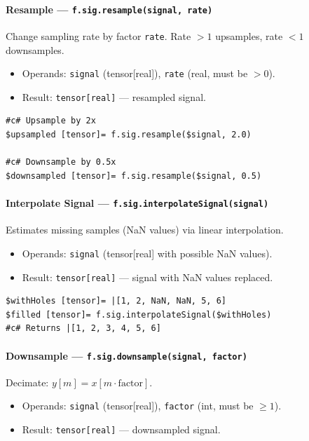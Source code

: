 \paragraph{Resample --- \texttt{f.sig.resample(signal, rate)}}
Change sampling rate by factor \texttt{rate}. Rate $> 1$ upsamples, rate $< 1$ downsamples.

\begin{itemize}
\item Operands: \texttt{signal} (tensor[real]), \texttt{rate} (real, must be $> 0$).
\item Result: \texttt{tensor[real]} --- resampled signal.
\end{itemize}

\begin{verbatim}
#c# Upsample by 2x
$upsampled [tensor]= f.sig.resample($signal, 2.0)

#c# Downsample by 0.5x
$downsampled [tensor]= f.sig.resample($signal, 0.5)
\end{verbatim}

\paragraph{Interpolate Signal --- \texttt{f.sig.interpolateSignal(signal)}}
Estimates missing samples (NaN values) via linear interpolation.

\begin{itemize}
\item Operands: \texttt{signal} (tensor[real] with possible NaN values).
\item Result: \texttt{tensor[real]} --- signal with NaN values replaced.
\end{itemize}

\begin{verbatim}
$withHoles [tensor]= |[1, 2, NaN, NaN, 5, 6]
$filled [tensor]= f.sig.interpolateSignal($withHoles)
#c# Returns |[1, 2, 3, 4, 5, 6]
\end{verbatim}

\paragraph{Downsample --- \texttt{f.sig.downsample(signal, factor)}}
Decimate: $y[m] = x[m \cdot \text{factor}]$.

\begin{itemize}
\item Operands: \texttt{signal} (tensor[real]), \texttt{factor} (int, must be $\geq 1$).
\item Result: \texttt{tensor[real]} --- downsampled signal.
\end{itemize}

